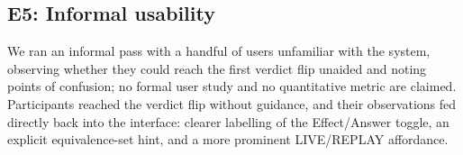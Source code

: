 \subsection{E5: Informal usability}

We ran an informal pass with a handful of users unfamiliar with the system,
observing whether they could reach the first verdict flip unaided and noting
points of confusion; no formal user study and no quantitative metric are
claimed. Participants reached the verdict flip without guidance, and their
observations fed directly back into the interface: clearer labelling of the
Effect/Answer toggle, an explicit equivalence-set hint, and a more prominent
LIVE/REPLAY affordance.
